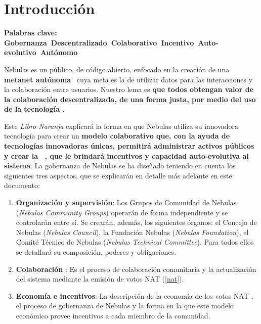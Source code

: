 
\section{Introducción}

\textbf{Palabras clave: Gobernanza\ Descentralizado\ Colaborativo\ Incentivo\ Auto-evolutivo\ Autónomo}

\vspace{2em}

Nebulas es un \blockchain público, de código abierto, enfocado en la creación de una
\textbf{metanet autónoma}~\cite{AutonomousMetanet} cuya meta es la de utilizar datos \onchain para las interacciones y la colaboración entre usuarios. Nuestro lema es \textbf{que todos obtengan valor de la colaboración descentralizada, de una forma justa, por medio del uso de la tecnología \blockchain.}~\cite{vision}

Este \textit{Libro Naranja} explicará la forma en que Nebulas utiliza su innovadora tecnología para crear un \textbf{modelo colaborativo que, con la ayuda de tecnologías innovadoras únicas, permitirá administrar activos públicos \onchain y crear la \DAO~\cite{DAO}, que le brindará incentivos y capacidad auto-evolutiva al sistema}. La gobernanza de Nebulas se ha diseñado teniendo en cuenta los siguientes tres aspectos, que se explicarán en detalle más adelante en este documento:

\begin{enumerate}
	\item \textbf{Organización y supervisión}:
	Los Grupos de Comunidad de Nebulas (\textit{Nebulas Community Groups}) operarán de forma independiente y se controlarán entre sí. Se crearán, además, los siguientes órganos: el Concejo de Nebulas (\textit{Nebulas Council}), la Fundación Nebulas (\textit{Nebulas Foundation}), el Comité Técnico de Nebulas (\textit{Nebulas Technical Committee}). Para todos ellos se detallará su composición, poderes y obligaciones.
	\item \textbf{Colaboración \onchain}:
	Es el proceso de colaboración comunitaria y la actualización del sistema mediante la emisión de votos NAT \onchain (\ref{nat}).
	\item \textbf{Economía e incentivos}:
	La descripción de la economía de los votos NAT \onchain, el proceso de gobernanza de Nebulas y la forma en la que este modelo económico provee incentivos a cada miembro de la comunidad.
\end{enumerate}